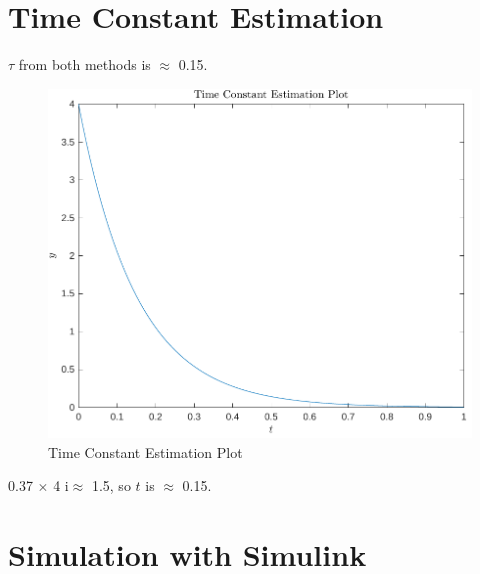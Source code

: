 \documentclass[12pt]{article}
\begin{document}
	\section{Time Constant Estimation}
			
			$\tau$  from both methods is $\approx$ 0.15.
		\begin{figure}[H]
			\centering
			\includegraphics[width=1\linewidth]{"Code/Fig/time_constant_plot.pdf"}
			\caption{Time Constant Estimation Plot}
			\label{fig:time_constant_plot}
		\end{figure}
	  	0.37 $\times$ 4 i$\approx$ 1.5, so $t$ is $\approx$ 0.15.
	\section{Simulation with Simulink}
\end{document}
